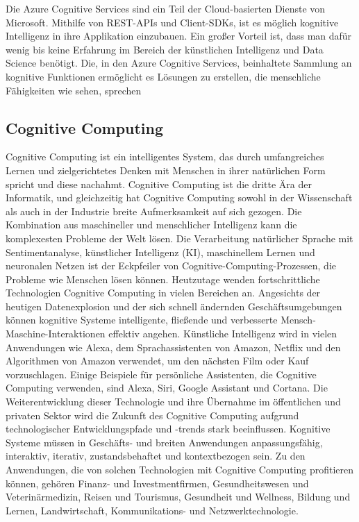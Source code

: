 Die Azure Cognitive Services sind ein Teil der Cloud-basierten Dienste von Microsoft. Mithilfe von REST-APIs und Client-SDKs, ist es möglich kognitive Intelligenz in ihre Applikation einzubauen. Ein großer Vorteil ist, dass man dafür wenig bis keine Erfahrung im Bereich der künstlichen Intelligenz und Data Science benötigt. Die, in den Azure Cognitive Services, beinhaltete Sammlung an kognitive Funktionen ermöglicht es Lösungen zu erstellen, die menschliche Fähigkeiten wie sehen, sprechen

\subsection{Cognitive Computing}

Cognitive Computing ist ein intelligentes System, das durch umfangreiches Lernen und zielgerichtetes Denken mit Menschen in ihrer natürlichen Form spricht und diese nachahmt. Cognitive Computing ist die dritte Ära der Informatik, und gleichzeitig hat Cognitive Computing sowohl in der Wissenschaft als auch in der Industrie breite Aufmerksamkeit auf sich gezogen. Die Kombination aus maschineller und menschlicher Intelligenz kann die komplexesten Probleme der Welt lösen. Die Verarbeitung natürlicher Sprache mit Sentimentanalyse, künstlicher Intelligenz (KI), maschinellem Lernen und neuronalen Netzen ist der Eckpfeiler von Cognitive-Computing-Prozessen, die Probleme wie Menschen lösen können. Heutzutage wenden fortschrittliche Technologien Cognitive Computing in vielen Bereichen an. Angesichts der heutigen Datenexplosion und der sich schnell ändernden Geschäftsumgebungen können kognitive Systeme intelligente, fließende und verbesserte Mensch-Maschine-Interaktionen effektiv angehen. Künstliche Intelligenz wird in vielen Anwendungen wie Alexa, dem Sprachassistenten von Amazon, Netflix und den Algorithmen von Amazon verwendet, um den nächsten Film oder Kauf vorzuschlagen. Einige Beispiele für persönliche Assistenten, die Cognitive Computing verwenden, sind Alexa, Siri, Google Assistant und Cortana. Die Weiterentwicklung dieser Technologie und ihre Übernahme im öffentlichen und privaten Sektor wird die Zukunft des Cognitive Computing aufgrund technologischer Entwicklungspfade und -trends stark beeinflussen. Kognitive Systeme müssen in Geschäfts- und breiten Anwendungen anpassungsfähig, interaktiv, iterativ, zustandsbehaftet und kontextbezogen sein. Zu den Anwendungen, die von solchen Technologien mit Cognitive Computing profitieren können, gehören Finanz- und Investmentfirmen, Gesundheitswesen und Veterinärmedizin, Reisen und Tourismus, Gesundheit und Wellness, Bildung und Lernen, Landwirtschaft, Kommunikations- und Netzwerktechnologie.

